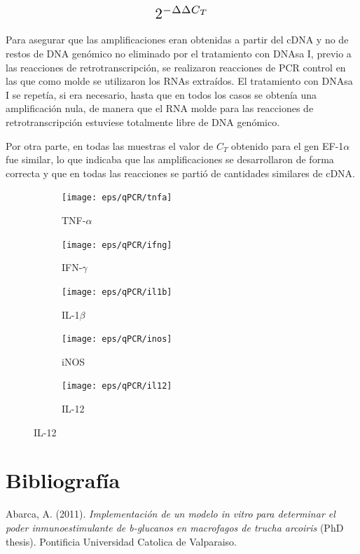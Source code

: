 \documentclass[12pt,a4paper,oneside]{scrbook}
\begin{document}
\begin{displaymath}
\scalebox{1.5}{
$2^{-\Delta\Delta C_T}$
}
\end{displaymath}

Para asegurar que las amplificaciones eran obtenidas a partir del cDNA y
no de restos de DNA genómico no eliminado por el tratamiento con DNAsa
I, previo a las reacciones de retrotranscripción, se realizaron
reacciones de PCR control en las que como molde se utilizaron los RNAs
extraídos. El tratamiento con DNAsa I se repetía, si era necesario,
hasta que en todos los casos se obtenía una amplificación nula, de
manera que el RNA molde para las reacciones de retrotranscripción
estuviese totalmente libre de DNA genómico.

Por otra parte, en todas las muestras el valor de $C_T$ obtenido para el
gen EF-1$\alpha$ fue similar, lo que indicaba que las amplificaciones se
desarrollaron de forma correcta y que en todas las reacciones se partió
de cantidades similares de cDNA.

\begin{figure}
\caption{Expresión relativa de los genes en estudio frente a EF-1$\alpha$}
    \begin{subfigure}{\textwidth}
        \caption{TNF-$\alpha$}
        \texttt{[image: eps/qPCR/tnfa]}
        \end{subfigure}
    \begin{subfigure}{\textwidth}
        \caption{IFN-$\gamma$}
        \texttt{[image: eps/qPCR/ifng]}
    \end{subfigure}
    \begin{subfigure}{\textwidth}
        \caption{IL-1$\beta$}
        \texttt{[image: eps/qPCR/il1b]}
    \end{subfigure}
    \begin{subfigure}{\textwidth}
        \caption{iNOS}
        \texttt{[image: eps/qPCR/inos]}
    \end{subfigure}
    \begin{subfigure}{\textwidth}
        \caption{IL-12}
        \texttt{[image: eps/qPCR/il12]}
    \end{subfigure}
\end{figure}

\clearpage

\chapter{Bibliografía}

Abarca, A. (2011). \emph{Implementación de un modelo in vitro para
determinar el poder inmunoestimulante de b-glucanos en macrofagos de
trucha arcoiris} (PhD thesis). Pontificia Universidad Catolica de
Valparaiso.
\end{document}
